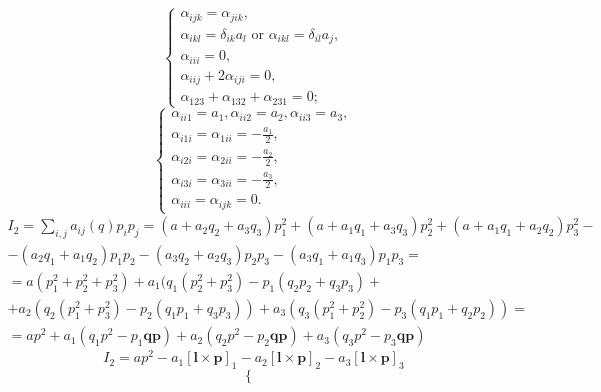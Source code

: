 \documentclass[12pt]{article}
\theoremstyle{definition}
\begin{document}
\begin{enumerate}
\begin{itemize}
\begin{itemize}
\begin{equation}
                \begin{cases}
                    \alpha_{ijk}=\alpha_{jik},\\
                    \alpha_{ikl}=\delta_{ik}a_l\text{ or }\alpha_{ikl}=\delta_{il}a_j,\\
                    \alpha_{iii}=0,\\
                    \alpha_{iij}+2\alpha_{iji}=0,\\
                    \alpha_{123}+\alpha_{132}+\alpha_{231}=0;
                \end{cases}
            \end{equation}
            \begin{equation}
                \begin{cases}
                    \alpha_{ii1}=a_1, \alpha_{ii2}=a_2,\alpha_{ii3}=a_3,\\
                    \alpha_{i1i}=\alpha_{1ii}=-\frac{a_1}{2},\\
                    \alpha_{i2i}=\alpha_{2ii}=-\frac{a_2}{2},\\
                    \alpha_{i3i}=\alpha_{3ii}=-\frac{a_3}{2},\\
                    \alpha_{iii}=\alpha_{ijk}=0.
                \end{cases}
            \end{equation}
            \begin{multline}
                I_2=\sum\limits_{i,j}a_{ij}(q)p_ip_j=(a+a_2q_2+a_3q_3)p_1^2+(a+a_1q_1+a_3q_3)p_2^2+(a+a_1q_1+a_2q_2)p_3^2-\\-(a_2q_1+a_1q_2)p_1p_2-(a_3q_2+a_2q_3)p_2p_3-(a_3q_1+a_1q_3)p_1p_3=\\=a(p_1^2+p_2^2+p_3^2)+a_1(q_1(p_2^2+p_3^2)-p_1(q_2p_2+q_3p_3)+\\+a_2(q_2(p_1^2+p_3^2)-p_2(q_1p_1+q_3p_3))+a_3(q_3(p_1^2+p_2^2)-p_3(q_1p_1+q_2p_2))=\\=ap^2+a_1(q_1p^2-p_1\bm{q}\bm{p})+a_2(q_2p^2-p_2\bm{q}\bm{p})+a_3(q_3p^2-p_3\bm{q}\bm{p})
            \end{multline}
            \begin{equation}
                I_2=ap^2-a_1[\bm{l}\times\bm{p}]_1-a_2[\bm{l}\times\bm{p}]_2-a_3[\bm{l}\times\bm{p}]_3
            \end{equation}
            \begin{equation}
            \begin{cases}

\end{cases}
\end{equation}
\end{itemize}
\end{itemize}
\end{enumerate}
\end{document}
